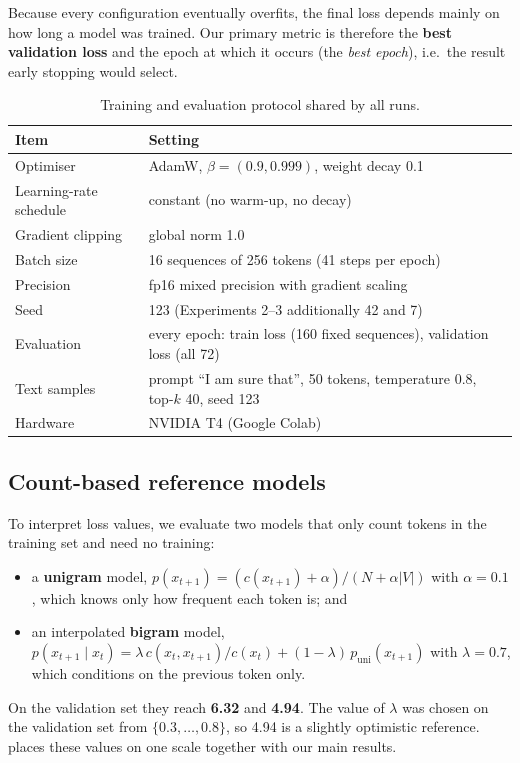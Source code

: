 \documentclass[11pt,a4paper]{article}
\begin{document}
Because every configuration eventually overfits, the final loss depends mainly on how long a model was trained. Our primary metric is therefore the \textbf{best validation loss} and the epoch at which it occurs (the \emph{best epoch}), i.e.\ the result early stopping would select.

\begin{table}[h]
  \centering
  \small
  \caption{Training and evaluation protocol shared by all runs.}
  \label{tab:protocol}
  \begin{tabularx}{\textwidth}{@{}lX@{}}
    \toprule
    Item & Setting \\
    \midrule
    Optimiser & AdamW, $\beta=(0.9, 0.999)$, weight decay 0.1 \\
    Learning-rate schedule & constant (no warm-up, no decay) \\
    Gradient clipping & global norm 1.0 \\
    Batch size & 16 sequences of 256 tokens (41 steps per epoch) \\
    Precision & fp16 mixed precision with gradient scaling \\
    Seed & 123 (Experiments 2--3 additionally 42 and 7) \\
    Evaluation & every epoch: train loss (160 fixed sequences), validation loss (all 72) \\
    Text samples & prompt ``I am sure that'', 50 tokens, temperature 0.8, top-$k$ 40, seed 123 \\
    Hardware & NVIDIA T4 (Google Colab) \\
    \bottomrule
  \end{tabularx}
\end{table}

\subsection{Count-based reference models}\label{sec:reference}
To interpret loss values, we evaluate two models that only count tokens in the training set and need no training:
\begin{itemize}[leftmargin=*]
  \item a \textbf{unigram} model, $p(x_{t+1}) = (c(x_{t+1}) + \alpha)/(N + \alpha|V|)$ with $\alpha=0.1$, which knows only how frequent each token is; and
  \item an interpolated \textbf{bigram} model, $p(x_{t+1}\mid x_t) = \lambda\, c(x_t, x_{t+1})/c(x_t) + (1-\lambda)\,p_{\text{uni}}(x_{t+1})$ with $\lambda = 0.7$, which conditions on the previous token only.
\end{itemize}
On the validation set they reach \textbf{6.32} and \textbf{4.94}. The value of $\lambda$ was chosen on the validation set from $\{0.3,\dots,0.8\}$, so 4.94 is a slightly optimistic reference.  places these values on one scale together with our main results.
\end{document}
